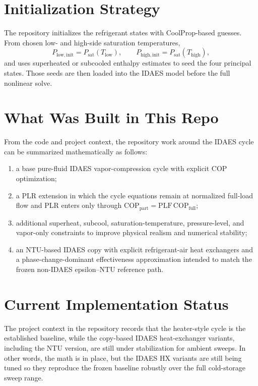 \documentclass[11pt]{article}
\begin{document}
\section{Initialization Strategy}
The repository initializes the refrigerant states with CoolProp-based guesses. From chosen low- and high-side saturation temperatures,
\begin{equation}
P_{\mathrm{low,init}} = P_{\mathrm{sat}}(T_{\mathrm{low}}),
\qquad
P_{\mathrm{high,init}} = P_{\mathrm{sat}}(T_{\mathrm{high}}),
\end{equation}
and uses superheated or subcooled enthalpy estimates to seed the four principal states. Those seeds are then loaded into the IDAES model before the full nonlinear solve.

\section{What Was Built in This Repo}
From the code and project context, the repository work around the IDAES cycle can be summarized mathematically as follows:
\begin{enumerate}
\item a base pure-fluid IDAES vapor-compression cycle with explicit COP optimization;
\item a PLR extension in which the cycle equations remain at normalized full-load flow and PLR enters only through $\mathrm{COP}_{\mathrm{part}}=\mathrm{PLF}\,\mathrm{COP}_{\mathrm{full}}$;
\item additional superheat, subcool, saturation-temperature, pressure-level, and vapor-only constraints to improve physical realism and numerical stability;
\item an NTU-based IDAES copy with explicit refrigerant-air heat exchangers and a phase-change-dominant effectiveness approximation intended to match the frozen non-IDAES epsilon--NTU reference path.
\end{enumerate}

\section{Current Implementation Status}
The project context in the repository records that the heater-style cycle is the established baseline, while the copy-based IDAES heat-exchanger variants, including the NTU version, are still under stabilization for ambient sweeps. In other words, the math is in place, but the IDAES HX variants are still being tuned so they reproduce the frozen baseline robustly over the full cold-storage sweep range.
\end{document}
